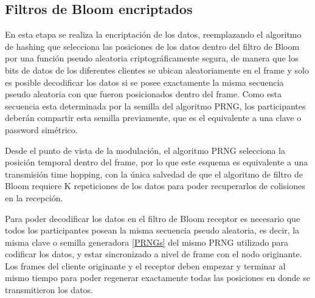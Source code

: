 
\subsection{Filtros de Bloom encriptados}

En esta etapa se realiza la encriptación de los datos, reemplazando el algoritmo de hashing que selecciona las posiciones de los datos dentro del filtro de Bloom por una función pseudo aleatoria criptográficamente segura, de manera que los bits de datos de los diferentes clientes se ubican aleatoriamente en el frame y solo es posible decodificar los datos si se posee exactamente la misma secuencia pseudo aleatoria con que fueron posicionados dentro del frame. Como esta secuencia esta determinada por la semilla del algoritmo PRNG, los participantes deberán compartir esta semilla previamente, que es el equivalente a una clave o password simétrico. 

Desde el punto de vista de la modulación, el algoritmo PRNG selecciona la posición temporal dentro del frame, por lo que este esquema es equivalente a una transmisión time hopping, con la única salvedad de que el algoritmo de filtro de Bloom requiere K repeticiones de los datos para poder recuperarlos de colisiones en la recepción.

Para poder decodificar los datos en el filtro de Bloom receptor es necesario que todos los participantes posean la misma secuencia pseudo aleatoria, es decir, la misma clave o semilla generadora \ref{PRNGs} del mismo PRNG utilizado para codificar los datos, y estar sincronizado a nivel de frame con el nodo originante. Los frames del cliente originante y el receptor deben empezar y terminar al mismo tiempo para poder regenerar exactamente todas las posiciones en donde se transmitieron los datos. 

